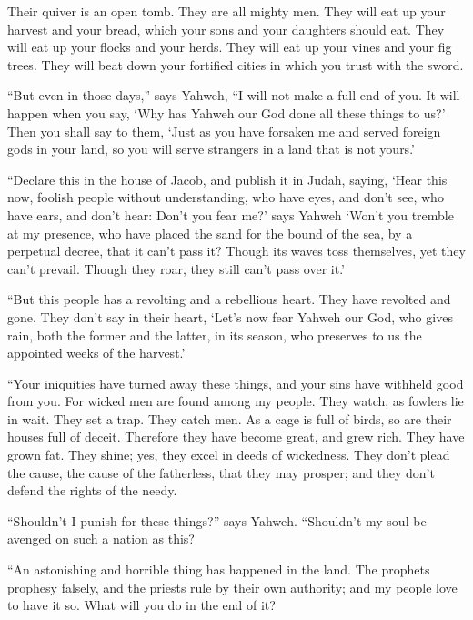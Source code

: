 {Their quiver is an open tomb. They are all mighty men.
They will eat up your harvest and your bread, which your sons and your daughters should eat. They will eat up your flocks and your herds. They will eat up your vines and your fig trees. They will beat down your fortified cities in which you trust with the sword.
\par }{\PP {}“But even in those days,” says Yahweh, “I will not make a full end of you.
It will happen when you say, ‘Why has Yahweh our God done all these things to us?’ Then you shall say to them, ‘Just as you have forsaken me and served foreign gods in your land, so you will serve strangers in a land that is not yours.’
\par }{\PP {}“Declare this in the house of Jacob, and publish it in Judah, saying,
‘Hear this now, foolish people without understanding, who have eyes, and don’t see, who have ears, and don’t hear:
Don’t you fear me?’ says Yahweh ‘Won’t you tremble at my presence, who have placed the sand for the bound of the sea, by a perpetual decree, that it can’t pass it? Though its waves toss themselves, yet they can’t prevail. Though they roar, they still can’t pass over it.’
\par }{\PP {}“But this people has a revolting and a rebellious heart. They have revolted and gone.
They don’t say in their heart, ‘Let’s now fear Yahweh our God, who gives rain, both the former and the latter, in its season, who preserves to us the appointed weeks of the harvest.’
\par }{\PP {}“Your iniquities have turned away these things, and your sins have withheld good from you.
For wicked men are found among my people. They watch, as fowlers lie in wait. They set a trap. They catch men.
As a cage is full of birds, so are their houses full of deceit. Therefore they have become great, and grew rich.
They have grown fat. They shine; yes, they excel in deeds of wickedness. They don’t plead the cause, the cause of the fatherless, that they may prosper; and they don’t defend the rights of the needy.
\par }{\PP {}“Shouldn’t I punish for these things?” says Yahweh. “Shouldn’t my soul be avenged on such a nation as this?
\par }{\PP {}“An astonishing and horrible thing has happened in the land.
The prophets prophesy falsely, and the priests rule by their own authority; and my people love to have it so. What will you do in the end of it?

}
